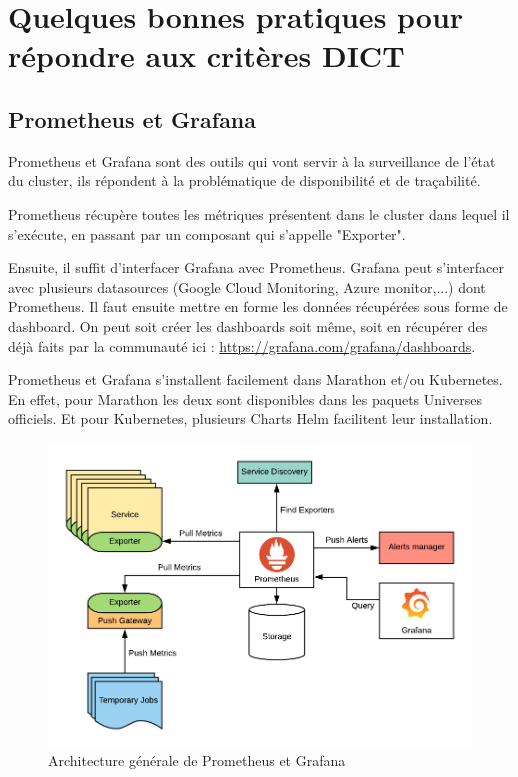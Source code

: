 \documentclass[11pt,fleqn]{book} %
\begin{document}
\section*{Quelques bonnes pratiques pour répondre aux critères DICT}
\subsection*{Prometheus et Grafana}
Prometheus et Grafana sont des outils qui vont servir à la surveillance de l'état du cluster, ils répondent à la problématique de disponibilité et de traçabilité.

Prometheus récupère toutes les métriques présentent dans le cluster dans lequel il s'exécute,  en passant par un composant qui s’appelle "Exporter". \newline

Ensuite, il suffit d'interfacer Grafana avec Prometheus. Grafana peut s'interfacer avec plusieurs datasources (Google Cloud Monitoring, Azure monitor,...) dont Prometheus. Il faut ensuite mettre en forme les données récupérées sous forme de dashboard. On peut soit créer les dashboards soit même, soit en récupérer des déjà faits par la communauté ici : \url{https://grafana.com/grafana/dashboards}.\newline 

Prometheus et Grafana s'installent facilement dans Marathon et/ou Kubernetes. En effet, pour Marathon les deux sont disponibles dans les paquets Universes officiels. Et pour Kubernetes, plusieurs Charts Helm facilitent leur installation.

\begin{figure}[H]\centering
\renewcommand{\figurename}{Schéma}
\includegraphics[scale=1]{Pictures/annexe/architecture.png}
\captionsetup{margin=1.5cm,format=hang,justification=justified}
\caption[]{Architecture générale de Prometheus et Grafana \newline}
\end{figure}
\end{document}
